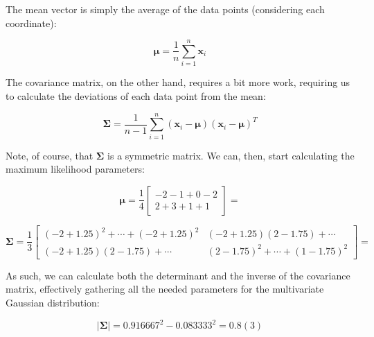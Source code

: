 \documentclass[12pt]{article}
\begin{document}
\begin{enumerate}[leftmargin=\labelsep]
\begin{enumerate}
{                The mean vector is simply the average of the data points (considering each coordinate):

                $$
                  \boldsymbol{\mu} = \frac{1}{n} \sum_{i=1}^n \boldsymbol{x}_i
                $$

                The covariance matrix, on the other hand, requires a bit more work,
                requiring us to calculate the deviations of each data point from the mean:

                $$
                  \boldsymbol{\Sigma} = \frac{1}{n - 1} \sum_{i=1}^n (\boldsymbol{x}_i - \boldsymbol{\mu}) (\boldsymbol{x}_i - \boldsymbol{\mu})^T
                $$

                Note, of course, that $\boldsymbol{\Sigma}$ is a symmetric matrix.
                We can, then, start calculating the maximum likelihood parameters:

                $$
                  \boldsymbol{\mu} = \frac{1}{4} \begin{bmatrix}
                    -2 - 1 + 0 - 2 \\
                    2 + 3 + 1 + 1
                  \end{bmatrix} = 
                $$

                $$
                  \boldsymbol{\Sigma} = \frac{1}{3} \begin{bmatrix}
                    (-2 + 1.25)^2 + \cdots + (-2 + 1.25)^2 & (-2 + 1.25)(2 - 1.75) + \cdots       \\
                    (-2 + 1.25)(2 - 1.75) + \cdots         & (2 - 1.75)^2 + \cdots + (1 - 1.75)^2
                  \end{bmatrix} = 
                $$

                As such, we can calculate both the determinant and the inverse of the covariance matrix,
                effectively gathering all the needed parameters for the multivariate Gaussian distribution:

                $$
                  |\boldsymbol{\Sigma}| = 0.916667^2 - 0.083333^2 = 0.8(3)
                $$

}
\end{enumerate}
\end{enumerate}
\end{document}
